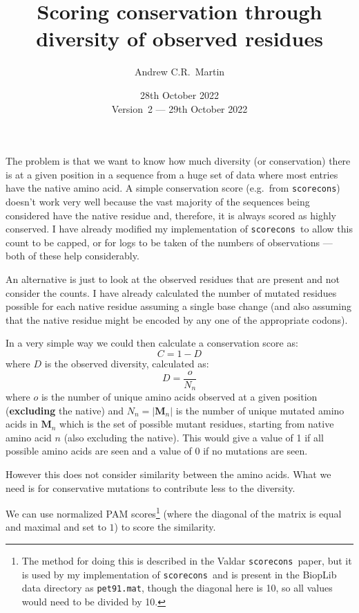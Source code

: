 \documentclass[a4paper]{article}
\title{Scoring conservation through diversity of observed residues}
\author{Andrew C.R.\ Martin}
\date{28th October 2022\\
Version~2 --- 29th October 2022}
\newcommand{\sco}{{\tt scorecons}}
\begin{document}
\maketitle

The problem is that we want to know how much diversity (or
conservation) there is at a given position in a sequence from a huge
set of data where most entries have the native amino acid. A simple
conservation score (e.g.\ from \sco) doesn't work very well because
the vast majority of the sequences being considered have the native
residue and, therefore, it is always scored as highly conserved. I
have already modified my implementation of \sco\ to allow this count
to be capped, or for logs to be taken of the numbers of observations
--- both of these help considerably.

An alternative is just to look at the observed residues that are
present and not consider the counts. I have already calculated the
number of mutated residues possible for each native residue assuming a
single base change (and also assuming that the native residue might be
encoded by any one of the appropriate codons).

In a very simple way we could then calculate a conservation score as:
\begin{equation}
  C = 1 - D
\label{eqn:C1}
\end{equation}
where $D$ is the observed diversity, calculated as:
\begin{equation}
  D = \frac{o}{N_n}
\label{eqn:D1}
\end{equation}
where $o$ is the number of unique amino acids observed at a given
position ({\bfseries excluding} the native) and $N_n = |\mathbf M_n|$ is the
number of unique mutated amino acids in $\mathbf M_n$ which is the set of
possible mutant residues, starting from native amino acid $n$ (also
excluding the native). This would give a value of 1 if all possible
amino acids are seen and a value of 0 if no mutations are seen.

However this does not consider similarity between the amino
acids.  What we need is for conservative mutations to contribute less
to the diversity.

We can use normalized PAM scores\footnote{The method for doing this is
  described in the Valdar \sco\ paper, but it is used by my
  implementation of \sco\ and is present in the BiopLib data directory
  as {\tt pet91.mat}, though the diagonal here is 10, so all values
  would need to be divided by 10.} (where the diagonal of the matrix
is equal and maximal and set to $1$) to score the similarity.
\end{document}
